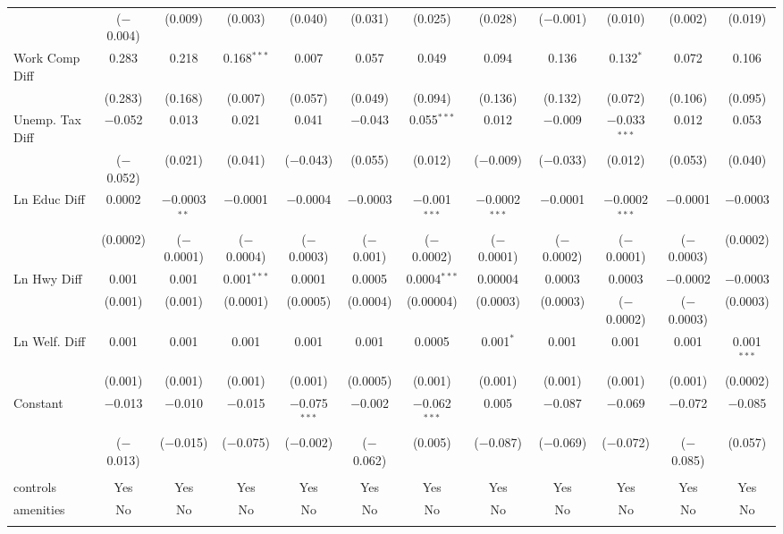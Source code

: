 \begin{table}[!htbp]
\begin{tabular}{@{\extracolsep{5pt}}lccccccccccc}
  & ($-$0.004) & (0.009) & (0.003) & (0.040) & (0.031) & (0.025) & (0.028) & ($-$0.001) & (0.010) & (0.002) & (0.019) \\ 
  Work Comp Diff & 0.283 & 0.218 & 0.168$^{***}$ & 0.007 & 0.057 & 0.049 & 0.094 & 0.136 & 0.132$^{*}$ & 0.072 & 0.106 \\ 
  & (0.283) & (0.168) & (0.007) & (0.057) & (0.049) & (0.094) & (0.136) & (0.132) & (0.072) & (0.106) & (0.095) \\ 
  Unemp. Tax Diff & $-$0.052 & 0.013 & 0.021 & 0.041 & $-$0.043 & 0.055$^{***}$ & 0.012 & $-$0.009 & $-$0.033$^{***}$ & 0.012 & 0.053 \\ 
  & ($-$0.052) & (0.021) & (0.041) & ($-$0.043) & (0.055) & (0.012) & ($-$0.009) & ($-$0.033) & (0.012) & (0.053) & (0.040) \\ 
  Ln Educ Diff & 0.0002 & $-$0.0003$^{**}$ & $-$0.0001 & $-$0.0004 & $-$0.0003 & $-$0.001$^{***}$ & $-$0.0002$^{***}$ & $-$0.0001 & $-$0.0002$^{***}$ & $-$0.0001 & $-$0.0003 \\ 
  & (0.0002) & ($-$0.0001) & ($-$0.0004) & ($-$0.0003) & ($-$0.001) & ($-$0.0002) & ($-$0.0001) & ($-$0.0002) & ($-$0.0001) & ($-$0.0003) & (0.0002) \\ 
  Ln Hwy Diff & 0.001 & 0.001 & 0.001$^{***}$ & 0.0001 & 0.0005 & 0.0004$^{***}$ & 0.00004 & 0.0003 & 0.0003 & $-$0.0002 & $-$0.0003 \\ 
  & (0.001) & (0.001) & (0.0001) & (0.0005) & (0.0004) & (0.00004) & (0.0003) & (0.0003) & ($-$0.0002) & ($-$0.0003) & (0.0003) \\ 
  Ln Welf. Diff & 0.001 & 0.001 & 0.001 & 0.001 & 0.001 & 0.0005 & 0.001$^{*}$ & 0.001 & 0.001 & 0.001 & 0.001$^{***}$ \\ 
  & (0.001) & (0.001) & (0.001) & (0.001) & (0.0005) & (0.001) & (0.001) & (0.001) & (0.001) & (0.001) & (0.0002) \\ 
  Constant & $-$0.013 & $-$0.010 & $-$0.015 & $-$0.075$^{***}$ & $-$0.002 & $-$0.062$^{***}$ & 0.005 & $-$0.087 & $-$0.069 & $-$0.072 & $-$0.085 \\ 
  & ($-$0.013) & ($-$0.015) & ($-$0.075) & ($-$0.002) & ($-$0.062) & (0.005) & ($-$0.087) & ($-$0.069) & ($-$0.072) & ($-$0.085) & (0.057) \\ 
 \hline \\[-1.8ex] 
controls & Yes & Yes & Yes & Yes & Yes & Yes & Yes & Yes & Yes & Yes & Yes \\ 
amenities & No & No & No & No & No & No & No & No & No & No & No \\ 
\hline \\[-1.8ex] 

\end{tabular}
\end{table}
